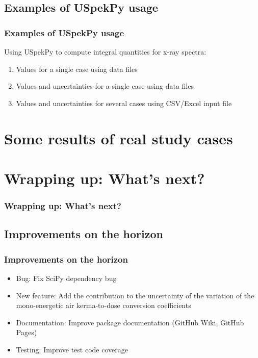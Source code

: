 \documentclass{beamer}
\newcommand{\highlight}[1]{{\color{blue} #1}}
\begin{document}
	\subsection{Examples of USpekPy usage}
	
	\begin{frame}
		\frametitle{Examples of USpekPy usage}
		Using USpekPy to compute integral quantities for x-ray spectra:
		\begin{enumerate}
			\item Values for a single case using data files
			\item Values and uncertainties for a single case using data files
			\item Values and uncertainties for several cases using CSV/Excel input file
		\end{enumerate}
		\bigskip
		\centering
		\href{https://github.com/xandratxan/uspekpy-seminar\#README}{}
	\end{frame}
	
	\section{Some results of real study cases}
	
	
	\section{Wrapping up: What’s next?}
		
	\begin{frame}
		\frametitle{Wrapping up: What’s next?}
		\tableofcontents[
		currentsection,
		sectionstyle=show/shaded,
		subsectionstyle=show/show/hide
		]
	\end{frame}
	
	\subsection{Improvements on the horizon}
	
	\begin{frame}
		\frametitle{Improvements on the horizon}
		\begin{itemize}
			\setlength\itemsep{1em}
			\item \highlight{Bug}: Fix SciPy dependency bug
			\item \highlight{New feature}: Add the contribution to the \highlight{uncertainty} of the variation of the mono-energetic air kerma-to-dose conversion coefficients
			\item \highlight{Documentation}: Improve package documentation (GitHub Wiki, GitHub Pages)
			\item \highlight{Testing}: Improve test code coverage
		\end{itemize}			
	\end{frame}
	
\end{document}

